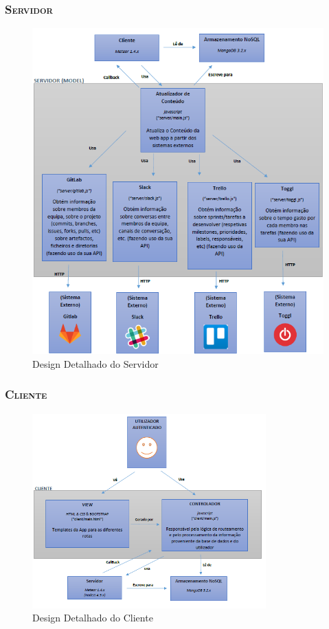 \documentclass[12pt]{article}
\begin{document}
\subsubsection{ \textsc{Servidor}}
\begin{figure}[h!]
	\centering \includegraphics[width=12cm]{public/Architecture and Design of Software_3.png}
	\caption{Design Detalhado do Servidor}
\end{figure}

\pagebreak


\subsubsection{ \textsc{Cliente}}
\begin{figure}[h!]
	\centering \includegraphics[width=9cm]{public/Architecture and Design of Software_4.png}
	\caption{Design Detalhado do Cliente}
\end{figure}
\end{document}
